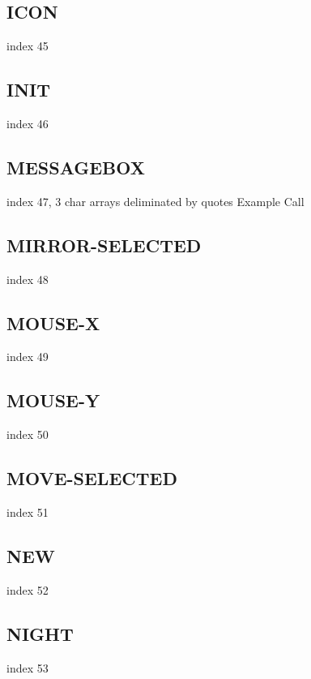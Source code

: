 \documentclass[11pt]{report}
\begin{document}
\subsection{ICON}

index 45

\subsection{INIT}

index 46

\subsection{MESSAGEBOX}

index 47, 3 char arrays deliminated by quotes Example Call

\subsection{MIRROR-SELECTED}

index 48

\subsection{MOUSE-X}

index 49

\subsection{MOUSE-Y}

index 50

\subsection{MOVE-SELECTED}

index 51

\subsection{NEW}

index 52

\subsection{NIGHT}

index 53
\end{document}
